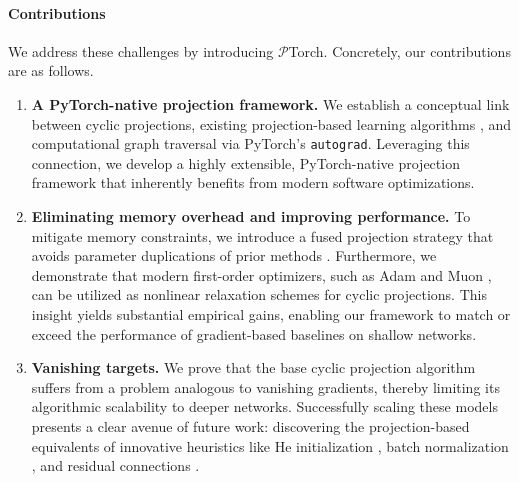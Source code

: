 \documentclass{article}
\begin{document}
\paragraph{Contributions} We address these challenges by introducing $\mathcal{P}$Torch. Concretely, our contributions are as follows.
\begin{enumerate}
    \item \textbf{A PyTorch-native projection framework.}
    We establish a conceptual link between cyclic projections, existing projection-based learning algorithms \cite{elser2019learning,bergmeister2025projection}, and computational graph traversal via PyTorch's \texttt{autograd}. Leveraging this connection, we develop a highly extensible, PyTorch-native projection framework that inherently benefits from modern software optimizations. 
    \item \textbf{Eliminating memory overhead and improving performance.} To mitigate memory constraints, we introduce a fused projection strategy that avoids parameter duplications of prior methods \cite{elser2019learning, bergmeister2025projection}. Furthermore, we demonstrate that modern first-order optimizers, such as Adam \cite{kingma2014adam} and Muon \cite{jordan2024muon}, can be utilized as nonlinear relaxation schemes for cyclic projections. This insight yields substantial empirical gains, enabling our framework to match or exceed the performance of gradient-based baselines on shallow networks. 
    \item \textbf{Vanishing targets.}
    We prove that the base cyclic projection algorithm suffers from a problem analogous to vanishing gradients, thereby limiting its algorithmic scalability to deeper networks. Successfully scaling these models presents a clear avenue of future work: discovering the projection-based equivalents of innovative heuristics like He initialization \cite{delving}, batch normalization \cite{ioffe2015batch}, and residual connections \cite{he2016deep}.
\end{enumerate}
\end{document}
